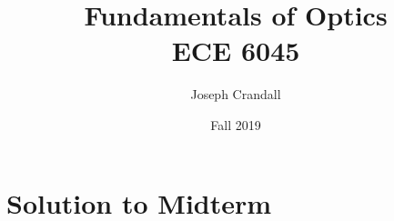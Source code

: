 

\usepackage{subfiles}
\usepackage{color,soul}
\usepackage{siunitx}
\usepackage{gensymb}

\title{Fundamentals of Optics\\
\large ECE 6045}
\author{Joseph Crandall}
\date{Fall 2019}


\maketitle

%

%

%

%

\section{Solution to Midterm}


%

%


